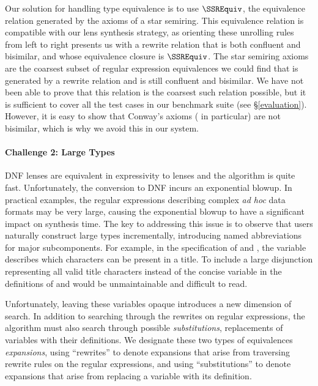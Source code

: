 \documentclass[sigplan,acmsmall]{acmart}
\begin{document}
Our solution for handling type equivalence is to use $\SSREquiv$, the equivalence relation
generated by the axioms of a star semiring.
This equivalence relation is compatible with our lens synthesis strategy, as
orienting these unrolling rules from left to right presents us with a rewrite
relation that is both confluent and bisimilar, and whose equivalence closure is
$\SSREquiv$.
The star semiring axioms are the 
coarsest subset of regular expression equivalences we could
find that is generated by a rewrite relation and is still confluent and
bisimilar.  We have not been able to prove that this relation is the coarsest
such relation possible, but it is sufficient to cover all the test
cases in our benchmark suite (see \S\ref{evaluation}).  However, it is easy to
show that Conway's axioms (\ProductstarRule{} in particular) are not bisimilar,
which is why we avoid this in our system.

\paragraph*{Challenge 2: Large Types}
DNF lenses are equivalent in expressivity to lenses and the algorithm
\SynthDNFLens{} is quite fast.
Unfortunately, the conversion to DNF incurs an exponential blowup.  In practical
examples, the regular expressions describing complex {\em ad hoc} data
formats may be very large, causing the exponential blowup to have a significant
impact on synthesis time.  The key to addressing this issue is to observe that
users naturally construct large types incrementally, introducing named
abbreviations for major subcomponents.  For example, in the
specification of \LegacyTitle{} and
\ModernTitle{}, the variable \TextChar{} describes which characters
can be present in a title.
To include a large disjunction representing all valid title characters
instead of the concise variable \TextChar{} in the definitions of \LegacyTitle{}
and \ModernTitle{} would be unmaintainable and difficult to read.

Unfortunately, leaving these variables opaque introduces a new dimension of
search.  In addition to searching through the rewrites on regular expressions,
the algorithm must also search through possible \emph{substitutions},
replacements of variables with their definitions.
We designate these two types of equivalences \emph{expansions}, using
``rewrites'' to denote expansions that arise from traversing rewrite rules on
the regular expressions, and
using ``substitutions'' to denote expansions that arise from replacing a
variable with its definition.
\end{document}
